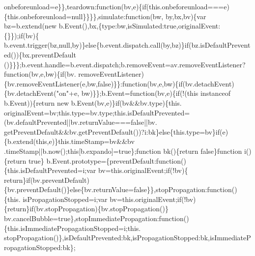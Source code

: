 \begin{DoxyCode}
      onbeforeunload=e\}\},teardown:\textcolor{keyword}{function}(bv,e)\{\textcolor{keywordflow}{if}(this.onbeforeunload===e)\{this.onbeforeunload=null\}\}\}\},simulate:\textcolor{keyword}{function}(bw,
      by,bx,bv)\{var bz=b.extend(\textcolor{keyword}{new} b.Event(),bx,\{type:bw,isSimulated:\textcolor{keyword}{true},originalEvent:\{\}\});\textcolor{keywordflow}{if}(bv)\{
      b.event.trigger(bz,null,by)\}\textcolor{keywordflow}{else}\{b.event.dispatch.call(by,bz)\}\textcolor{keywordflow}{if}(bz.isDefaultPrevented())\{bx.preventDefault
      ()\}\}\};b.event.handle=b.event.dispatch;b.removeEvent=av.removeEventListener?\textcolor{keyword}{function}(bv,e,bw)\{\textcolor{keywordflow}{if}(bv.
      removeEventListener)\{bv.removeEventListener(e,bw,\textcolor{keyword}{false})\}\}:\textcolor{keyword}{function}(bv,e,bw)\{\textcolor{keywordflow}{if}(bv.detachEvent)\{bv.detachEvent(\textcolor{stringliteral}{"on"}+e,
      bw)\}\};b.Event=\textcolor{keyword}{function}(bv,e)\{\textcolor{keywordflow}{if}(!(\textcolor{keyword}{this} instanceof b.Event))\{\textcolor{keywordflow}{return} \textcolor{keyword}{new} b.Event(bv,e)\}\textcolor{keywordflow}{if}(bv&&bv.type)\{this.
      originalEvent=bv;this.type=bv.type;this.isDefaultPrevented=(bv.defaultPrevented||bv.returnValue===\textcolor{keyword}{false}||bv.
      getPreventDefault&&bv.getPreventDefault())?i:bk\}\textcolor{keywordflow}{else}\{this.type=bv\}\textcolor{keywordflow}{if}(e)\{b.extend(\textcolor{keyword}{this},e)\}this.timeStamp=bv&&bv
      .timeStamp||b.now();\textcolor{keyword}{this}[b.expando]=\textcolor{keyword}{true}\};\textcolor{keyword}{function} bk()\{\textcolor{keywordflow}{return} \textcolor{keyword}{false}\}\textcolor{keyword}{function} i()\{\textcolor{keywordflow}{return} \textcolor{keyword}{true}\}
      b.Event.prototype=\{preventDefault:\textcolor{keyword}{function}()\{this.isDefaultPrevented=i;var bv=this.originalEvent;\textcolor{keywordflow}{if}(!bv)\{\textcolor{keywordflow}{
      return}\}\textcolor{keywordflow}{if}(bv.preventDefault)\{bv.preventDefault()\}\textcolor{keywordflow}{else}\{bv.returnValue=\textcolor{keyword}{false}\}\},stopPropagation:\textcolor{keyword}{function}()\{this.
      isPropagationStopped=i;var bv=this.originalEvent;\textcolor{keywordflow}{if}(!bv)\{\textcolor{keywordflow}{return}\}\textcolor{keywordflow}{if}(bv.stopPropagation)\{bv.stopPropagation()\}
      bv.cancelBubble=\textcolor{keyword}{true}\},stopImmediatePropagation:\textcolor{keyword}{function}()\{this.isImmediatePropagationStopped=i;this.
      stopPropagation()\},isDefaultPrevented:bk,isPropagationStopped:bk,isImmediatePropagationStopped:bk\};

\end{DoxyCode}
